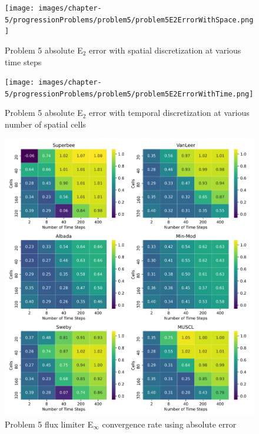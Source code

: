 \begin{figure}[p]
    \centering
    \texttt{[image: images/chapter-5/progressionProblems/problem5/problem5E2ErrorWithSpace.png]}
    \caption{Problem 5 absolute E${}_{2}$ error with spatial discretization at various time steps }
    \label{fig:problem5_l2error_spatial_results}
\end{figure}

\clearpage

\begin{figure}[p]
    \centering
    \texttt{[image: images/chapter-5/progressionProblems/problem5/problem5E2ErrorWithTime.png]}
    \caption{Problem 5 absolute E${}_{2}$ error with temporal discretization at various number of spatial cells}
    \label{fig:problem5_l2error_time_results}
\end{figure}

\clearpage

\begin{figure}[p]
    \centering
    \includegraphics[width=6in]{images/chapter-5/progressionProblems/problem5/problem5EinftyFluxLimiterConvergenceRate.png}
    \caption{Problem 5 flux limiter E${}_{\infty}$ convergence rate using absolute error}
    \label{fig:problem5_linferror_fluxlimiter_convergence_rate}
\end{figure}

